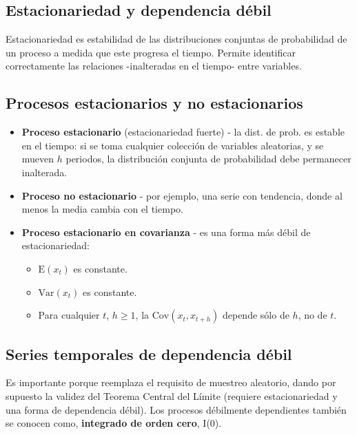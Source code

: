 \documentclass[10pt, a4paper, landscape]{extarticle}
\newcommand{\E}{\mathrm{E}}
\newcommand{\Var}{\mathrm{Var}}
\newcommand{\Cov}{\mathrm{Cov}}
\begin{document}
\begin{multicols}{3}
\section*{Estacionariedad y dependencia débil}

Estacionariedad es estabilidad de las distribuciones conjuntas de probabilidad de un proceso a medida que este progresa el tiempo. Permite identificar correctamente las relaciones -inalteradas en el tiempo- entre variables.

\subsection*{Procesos estacionarios y no estacionarios}

\begin{itemize}[leftmargin=*]
	\item \textbf{Proceso estacionario} (estacionariedad fuerte) - la dist. de prob. es estable en el tiempo: si se toma cualquier colección de variables aleatorias, y se mueven $h$ periodos, la distribución conjunta de probabilidad debe permanecer inalterada.

\columnbreak

	\item \textbf{Proceso no estacionario} - por ejemplo, una serie con tendencia, donde al menos la media cambia con el tiempo.
	\item \textbf{Proceso estacionario en covarianza} - es una forma más débil de estacionariedad:
	\begin{itemize}[leftmargin=*]
		\item $\E(x_t)$ es constante.
		\item $\Var(x_t)$ es constante.
		\item Para cualquier $t$,  $h \geq 1$, la $\Cov(x_t, x_{t + h})$ depende sólo de $h$, no de $t$.
	\end{itemize}
\end{itemize}

\subsection*{Series temporales de dependencia débil}

Es importante porque reemplaza el requisito de muestreo aleatorio, dando por supuesto la validez del Teorema Central del Límite (requiere estacionariedad y una forma de dependencia débil). Los procesos débilmente dependientes también se conocen como, \textbf{integrado de orden cero}, I(0).


\end{multicols}
\end{document}
